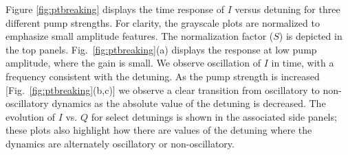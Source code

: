 \documentclass[prl,twocolumn,english,superscriptaddress,floatfix,longbibliography]{revtex4-2}
\begin{document}
Figure \ref{fig:ptbreaking} displays the time response of $I$ versus detuning for three different pump strengths. For clarity, the grayscale plots are normalized to emphasize small amplitude features. The normalization factor ($S$) is depicted in the top panels.  Fig.~\ref{fig:ptbreaking}(a) displays the response at low pump amplitude, where the gain is small. We observe oscillation of $I$ in time, with a frequency consistent with the detuning.  As the pump strength is increased [Fig.~\ref{fig:ptbreaking}(b,c)] we observe a clear transition from oscillatory to non-oscillatory dynamics as the absolute value of the detuning is decreased. The evolution of $I$ vs. $Q$ for select detunings is shown in the associated side panels; these plots also highlight how there are values of the detuning where the dynamics are alternately oscillatory or non-oscillatory. %
\end{document}

